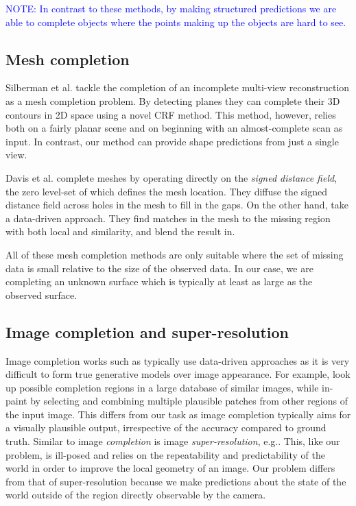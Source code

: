 \documentclass[10pt,twocolumn,letterpaper]{article}
\makeatletter
\renewcommand*{\eg}{e.g.\@\xspace}
\newcommand*{\ea}{et al.\@\xspace}
\newcommand{\note}[1]{\textcolor{blue}{NOTE: #1}}
\makeatother
\begin{document}
\note{In contrast to these methods, by making structured predictions we are able to complete objects where the points making up the objects are hard to see.}



\subsection{Mesh completion}

Silberman \ea \cite{silberman-eccv-2014} tackle the completion of an incomplete multi-view reconstruction as a mesh completion problem.
By detecting planes they can complete their 3D contours in 2D space using a novel CRF method.
This method, however, relies both on a fairly planar scene and on beginning with an almost-complete scan as input.
In contrast, our method can provide shape predictions from just a single view.

Davis \ea \cite{davis-3dpvt-2002} complete meshes by operating directly on the \emph{signed distance field}, the zero level-set of which defines the mesh location. They diffuse the signed distance field across holes in the mesh to fill in the gaps.
On the other hand, \cite{harary-tog-2013} take a data-driven approach.
They find matches in the mesh to the missing region with both local and similarity, and blend the result in.

All of these mesh completion methods are only suitable where the set of missing data is small relative to the size of the observed data.
In our case, we are completing an unknown surface which is typically at least as large as the observed surface.



\subsection{Image completion and super-resolution}

Image completion works such as \cite{hays-siggraph-2007, criminisi-cvpr-2003}
typically use data-driven approaches as it is very difficult to form true generative models over image appearance.
For example, \cite{hays-siggraph-2007} look up possible completion regions in a large database of similar images, while \cite{criminisi-cvpr-2003} in-paint by selecting and combining multiple plausible patches from other regions of the input image.
This differs from our task as image completion typically aims for a visually plausible output, irrespective of the accuracy compared to ground truth.
Similar to image \emph{completion} is image \emph{super-resolution}, \eg \cite{macaodha-eccv-2012, dong-eccv-2014}. 
This, like our problem, is ill-posed and relies on the repeatability and predictability of the world in order to improve the local geometry of an image.
Our problem differs from that of super-resolution because we make predictions about the state of the world outside of the region directly observable by the camera.
\end{document}
